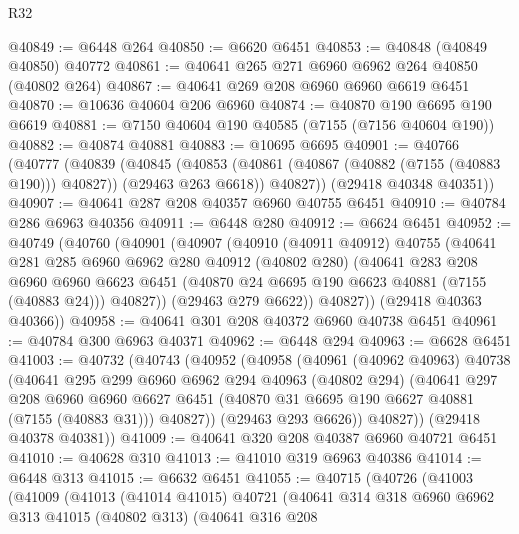 \begin{lexlean}{R32}
\begin{coremodule}
@40849 := @6448 @264
@40850 := @6620 @6451
@40853 := @40848 (@40849 @40850) @40772
@40861 := @40641 @265 @271 @6960 @6962 @264 @40850 (@40802 @264)
@40867 := @40641 @269 @208 @6960 @6960 @6619 @6451
@40870 := @10636 @40604 @206 @6960
@40874 := @40870 @190 @6695 @190 @6619
@40881 := @7150 @40604 @190 @40585 (@7155 (@7156 @40604 @190))
@40882 := @40874 @40881
@40883 := @10695 @6695
@40901 := @40766
    (@40777
      (@40839
        (@40845
          (@40853 (@40861 (@40867 (@40882 (@7155 (@40883 @190))) @40827)) (@29463 @263 @6618))
          @40827))
      (@29418 @40348 @40351))
@40907 := @40641 @287 @208 @40357 @6960 @40755 @6451
@40910 := @40784 @286 @6963 @40356
@40911 := @6448 @280
@40912 := @6624 @6451
@40952 := @40749
    (@40760
      (@40901
        (@40907
          (@40910
            (@40911 @40912)
            @40755
            (@40641
              @281
              @285
              @6960
              @6962
              @280
              @40912
              (@40802 @280)
              (@40641
                @283
                @208
                @6960
                @6960
                @6623
                @6451
                (@40870 @24 @6695 @190 @6623 @40881 (@7155 (@40883 @24)))
                @40827))
            (@29463 @279 @6622))
          @40827))
      (@29418 @40363 @40366))
@40958 := @40641 @301 @208 @40372 @6960 @40738 @6451
@40961 := @40784 @300 @6963 @40371
@40962 := @6448 @294
@40963 := @6628 @6451
@41003 := @40732
    (@40743
      (@40952
        (@40958
          (@40961
            (@40962 @40963)
            @40738
            (@40641
              @295
              @299
              @6960
              @6962
              @294
              @40963
              (@40802 @294)
              (@40641
                @297
                @208
                @6960
                @6960
                @6627
                @6451
                (@40870 @31 @6695 @190 @6627 @40881 (@7155 (@40883 @31)))
                @40827))
            (@29463 @293 @6626))
          @40827))
      (@29418 @40378 @40381))
@41009 := @40641 @320 @208 @40387 @6960 @40721 @6451
@41010 := @40628 @310
@41013 := @41010 @319 @6963 @40386
@41014 := @6448 @313
@41015 := @6632 @6451
@41055 := @40715
    (@40726
      (@41003
        (@41009
          (@41013
            (@41014 @41015)
            @40721
            (@40641
              @314
              @318
              @6960
              @6962
              @313
              @41015
              (@40802 @313)
              (@40641
                @316
                @208

\end{coremodule}
\end{lexlean}
